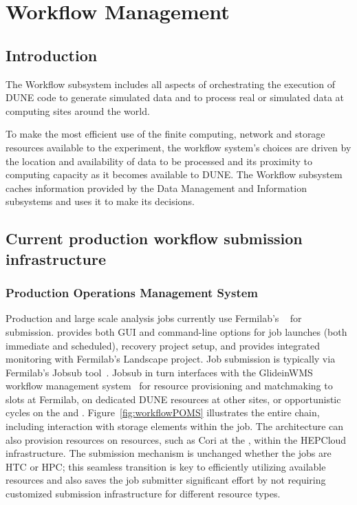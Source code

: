 \documentclass[../main-v1.tex]{subfiles}
\begin{document}
\chapter{Workflow Management }
\label{ch:wkflow}

\section{Introduction}
\label{sec:flow:intro} 

The Workflow subsystem includes all aspects of orchestrating the execution of DUNE code to generate simulated data and to process real or simulated data at computing sites around the world. 

To make the most efficient use of the finite computing, network and storage resources available to the experiment, the workflow system's choices are driven by the location and availability of data to be processed and its proximity to computing capacity as it becomes available to DUNE. The Workflow subsystem caches information provided by the Data Management and Information subsystems and uses it to make its decisions.


\section{Current production workflow submission infrastructure}
\label{sec:current}

\subsection{Production Operations Management System}
\label{subsec:jobsub}

Production and large scale analysis jobs currently use Fermilab's ~\cite{Mengel:2020wev} for submission.  provides both GUI and command-line options for job launches (both immediate and scheduled), recovery project setup, and provides integrated monitoring with Fermilab's Landscape project. Job submission is typically via Fermilab's Jobsub tool~\cite{box2014fife}. Jobsub in
turn interfaces with the GlideinWMS workflow management system~\cite{sfiligoi2009pilot} for resource provisioning and matchmaking to slots at Fermilab, on dedicated DUNE resources at other sites, or opportunistic cycles on the    and . Figure~\ref{fig:workflowPOMS} illustrates the entire chain, including interaction with storage elements within the job.
The architecture can also provision resources on  resources, such as Cori at the , within the HEPCloud~\cite{mhashilkar2019hepcloud} infrastructure. The submission mechanism is unchanged whether the jobs are HTC or HPC; this seamless transition is key to efficiently utilizing available resources and also saves the job submitter significant effort by not requiring customized submission infrastructure for different resource types.
\end{document}
